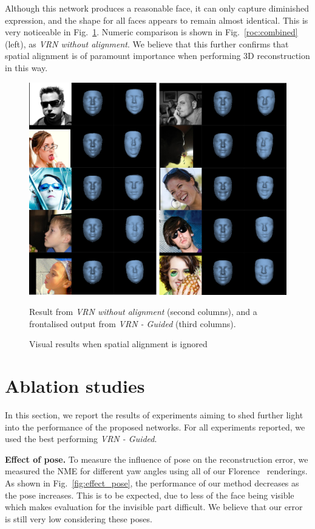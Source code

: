   Although this network produces a reasonable face, it can only capture diminished expression, and
  the shape for all faces appears to remain almost identical. This is very noticeable in Fig.~\ref{fig:frontal_visual}. Numeric comparison is shown in Fig.~\ref{roc:combined} (left), as \textit{VRN without alignment}. We believe that this further confirms that spatial alignment is of paramount importance when performing 3D reconstruction in this way.




\begin{figure}
\includegraphics[width=\linewidth]{img/frontal.png}
\caption{Visual results when spatial alignment is ignored}{Result from
  \textit{VRN without alignment} (second columns), and a frontalised
  output from \textit{VRN - Guided} (third columns).}
  \label{fig:frontal_visual}
\end{figure}

\section{Ablation studies}

In this section, we report the results of experiments aiming to shed
further light into the performance of the proposed networks. For all
experiments reported, we used the best performing \textit{VRN -
  Guided}.

\textbf{Effect of pose.} To measure the influence
of pose on the reconstruction error, we measured the NME for different
yaw angles using all of our Florence~\cite{masi2d3dFaceData}
renderings. As shown in Fig.~\ref{fig:effect_pose}, the performance of
our method decreases as the pose increases. This is to be expected,
due to less of the face being visible which makes evaluation for the
invisible part difficult. We believe that our error is still very low
considering these
poses. %


